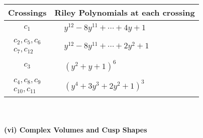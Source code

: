 \documentclass[1p]{elsarticle_modified}
\theoremstyle{definition}
\begin{document}
\begin{tabular}{m{50pt}|m{274pt}}
Crossings & \hspace{64pt}Riley Polynomials at each crossing \\
\hline $$\begin{aligned}c_{1}\end{aligned}$$&$\begin{aligned}
&y^{12}-8 y^{11}+\cdots+4 y+1
\end{aligned}$\\
\hline $$\begin{aligned}c_{2},c_{5},c_{6}\\c_{7},c_{12}\end{aligned}$$&$\begin{aligned}
&y^{12}-8 y^{11}+\cdots+2 y^2+1
\end{aligned}$\\
\hline $$\begin{aligned}c_{3}\end{aligned}$$&$\begin{aligned}
&(y^2+y+1)^6
\end{aligned}$\\
\hline $$\begin{aligned}c_{4},c_{8},c_{9}\\c_{10},c_{11}\end{aligned}$$&$\begin{aligned}
&(y^4+3 y^3+2 y^2+1)^3
\end{aligned}$\\
\hline
\end{tabular}\\~\\
\newpage\flushleft \textbf{(vi) Complex Volumes and Cusp Shapes}
\end{document}
